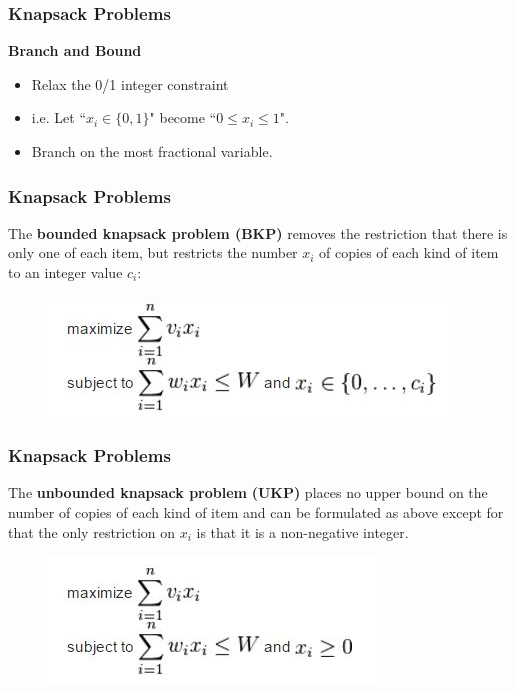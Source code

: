 \documentclass{beamer}
\begin{document}
\begin{frame}
	\frametitle{Knapsack Problems}
	\Large
\noindent \textbf{Branch and Bound}
\begin{itemize}
	\item  Relax the 0/1 integer constraint 
	\item  i.e. Let ``$x_i \in \{0,1\}$" become ``$0\leq x_i \leq 1$".
	\item Branch on the most fractional variable.
\end{itemize}
\end{frame}
\begin{frame}
	\frametitle{Knapsack Problems}
	\Large
	The \textbf{bounded knapsack problem (BKP)} removes the restriction that there is only one of each item, but restricts the number $x_i$ of copies of each kind of item to an integer value $c_i$:
	\begin{figure}
		\centering
		\includegraphics[width=0.7\linewidth]{boundedknapsack}

	\end{figure}
\end{frame}
\begin{frame}
	\frametitle{Knapsack Problems}
	\Large
	The \textbf{unbounded knapsack problem} \textbf{(UKP)} places no upper bound on the number of copies of each kind of item and can be formulated as above except for that the only restriction on $x_i$ is that it is a non-negative integer.
	\begin{figure}
		\centering
		\includegraphics[width=0.7\linewidth]{unboundedknapsack}
	\end{figure}
	
\end{frame}
\end{document}

